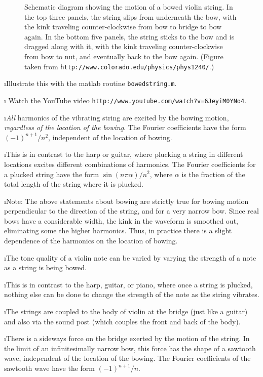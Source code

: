 \begin{figure}[htbp]
\begin{center}
\caption{Schematic diagram showing the motion of a bowed violin string.
In the top three panels, the string slips from underneath 
the bow, with the kink traveling counter-clockwise
from bow to bridge to bow again.
In the bottom five panels, the string sticks to the bow 
and is dragged along with it, with the kink traveling 
counter-clockwise from bow to nut, and eventually back to 
the bow again.
(Figure taken from {\tt http://www.colorado.edu/physics/phys1240/}.)}
\label{f:violinbowed}
\end{center}
\end{figure}

\i \demo Illustrate this with the matlab routine
{\tt bowedstring.m}.

\i \demo
Watch the YouTube video
{\tt http://www.youtube.com/watch?v=6JeyiM0YNo4}.

\i {\em All} harmonics of the vibrating string are 
excited by  the bowing motion, 
{\em regardless of the location of the bowing}.
The Fourier coefficients have the form
$(-1)^{n+1}/n^2$, independent of the location of
bowing.

\i This is in contrast to the harp or guitar, where 
plucking a string in different locations excites different
combinations of harmonics.
The Fourier coefficients for a plucked string have the form
$\sin(n\pi\alpha)/n^2$, where $\alpha$ is the fraction
of the total length of the string where it is plucked.

\i Note:
The above statements about bowing are strictly true 
for bowing motion perpendicular to the direction of 
the string, and for a very narrow bow.
Since real bows have a considerable width, 
the kink in the waveform is smoothed out, eliminating
some the higher harmonics.
Thus, in practice there is a slight dependence of 
the harmonics on the location of bowing.

\i The tone quality of a violin note can be varied by 
varying the strength of a note as a string is being bowed.
 
\i This is in contrast to the  harp, guitar, or piano, 
where once a string is plucked, nothing else can be
done to change the strength of the note as the string vibrates.
 
\i The strings are coupled
to the body of violin at the bridge
(just like a guitar) and also via the 
sound post (which couples the front and back
of the body).

\i There is a sideways force on the bridge exerted
by the motion of the string.
In the limit of an infinitesimally narrow bow, this
force has the shape of a sawtooth wave, independent
of the location of the bowing.
The Fourier coefficients of the sawtooth wave
have the form $(-1)^{n+1}/n$.

